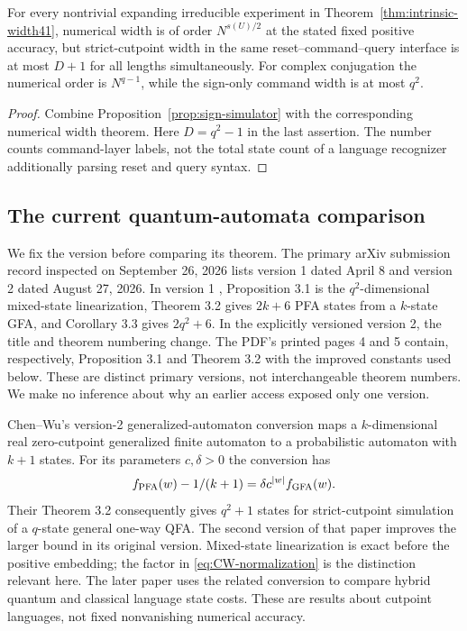 \begin{corollary}
\label{cor:semantic-separation}
For every nontrivial expanding irreducible experiment in
Theorem~\ref{thm:intrinsic-width41}, numerical width is of order
$N^{s(U)/2}$ at the stated fixed positive accuracy, but strict-cutpoint
width in the same reset--command--query interface is at most $D+1$
for all lengths simultaneously. For complex conjugation the numerical
order is $N^{q-1}$, while the sign-only command width is at most $q^2$.
\end{corollary}
\begin{proof}
Combine Proposition~\ref{prop:sign-simulator} with the corresponding
numerical width theorem. Here $D=q^2-1$ in the last assertion.
The number counts command-layer labels, not the total state count of
a language recognizer additionally parsing reset and query syntax.
\end{proof}

\subsection{The current quantum-automata comparison}
We fix the version before comparing its theorem. The primary arXiv
submission record inspected on September 26, 2026 lists version 1 dated
April 8 and version 2 dated August 27, 2026. In version 1
\cite{CWaprV1}, Proposition 3.1 is the $q^2$-dimensional mixed-state
linearization, Theorem 3.2 gives $2k+6$ PFA states from a $k$-state
GFA, and Corollary 3.3 gives $2q^2+6$. In the explicitly versioned
version 2, the title and theorem numbering change. The PDF's printed
pages 4 and 5 contain, respectively, Proposition 3.1 and Theorem 3.2
with the improved constants used below. These are distinct primary
versions, not interchangeable theorem numbers. We make no inference
about why an earlier access exposed only one version.

Chen--Wu's version-2 generalized-automaton conversion
\cite[Proposition 3.1]{CWapr} maps a $k$-dimensional real
zero-cutpoint generalized finite automaton to a probabilistic automaton
with $k+1$ states. For its parameters $c,\delta>0$ the conversion has
\begin{equation}\label{eq:CW-normalization}
 f_{\rm PFA}(w)-1/(k+1)=\delta c^{|w|} f_{\rm GFA}(w).
\end{equation}
Their Theorem 3.2 consequently gives $q^2+1$ states for strict-cutpoint
simulation of a $q$-state general one-way QFA. The second version of
that paper improves the larger bound in its original version.
Mixed-state linearization is exact before the positive embedding;
the factor in \eqref{eq:CW-normalization} is the distinction relevant
here. The later paper \cite[Proposition 4 and Theorems 11--12]{CWmay}
uses the related conversion to compare hybrid quantum and classical
language state costs. These are results about cutpoint languages,
not fixed nonvanishing numerical accuracy.

